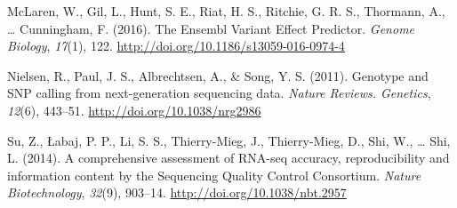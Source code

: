 \documentclass[12pt,twoside]{reedthesis}
\theoremstyle{definition}
\theoremstyle{definition}
\theoremstyle{remark}
\begin{document}
  \hypertarget{ref-McLaren2016}{}
  McLaren, W., Gil, L., Hunt, S. E., Riat, H. S., Ritchie, G. R. S.,
  Thormann, A., \ldots{} Cunningham, F. (2016). The Ensembl Variant Effect
  Predictor. \emph{Genome Biology}, \emph{17}(1), 122.
  \url{http://doi.org/10.1186/s13059-016-0974-4}
  
  \hypertarget{ref-Nielsen2011}{}
  Nielsen, R., Paul, J. S., Albrechtsen, A., \& Song, Y. S. (2011).
  Genotype and SNP calling from next-generation sequencing data.
  \emph{Nature Reviews. Genetics}, \emph{12}(6), 443--51.
  \url{http://doi.org/10.1038/nrg2986}
  
  \hypertarget{ref-Su2014}{}
  Su, Z., Łabaj, P. P., Li, S. S., Thierry-Mieg, J., Thierry-Mieg, D.,
  Shi, W., \ldots{} Shi, L. (2014). A comprehensive assessment of RNA-seq
  accuracy, reproducibility and information content by the Sequencing
  Quality Control Consortium. \emph{Nature Biotechnology}, \emph{32}(9),
  903--14. \url{http://doi.org/10.1038/nbt.2957}


\end{document}
